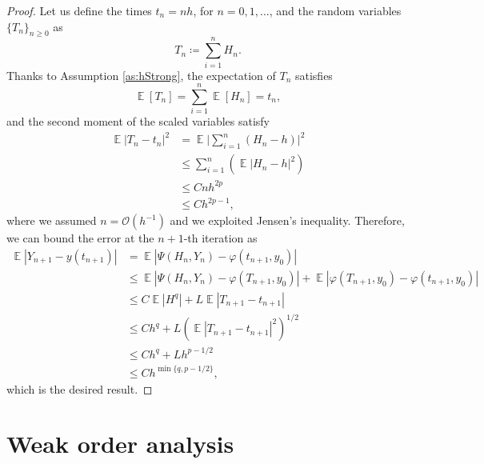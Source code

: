 \documentclass{siamart1116}
\numberwithin{theorem}{section}
\renewcommand{\phi}{\varphi}
\newcommand{\OO}{\mathcal{O}}
\newcommand{\defeq}{\coloneqq}
\newcommand{\E}{\operatorname{\mathbb{E}}}
\begin{document}
\begin{proof} Let us define the times $t_n = nh$, for $n = 0, 1, \ldots$, and the random variables $\{T_n\}_{n\geq 0}$ as
	\begin{equation}
		T_n \defeq \sum_{i=1}^{n} H_n.
	\end{equation}
	Thanks to Assumption \ref{as:hStrong}, the expectation of $T_n$ satisfies
	\begin{equation}
		\E[T_n] = \sum_{i=1}^{n}\E[H_n] = t_n,
	\end{equation} 
	and the second moment of the scaled variables satisfy
	\begin{equation}
	\begin{aligned}
		\E|T_n - t_n|^2 &= \E\Big|\sum_{i=1}^{n}(H_n - h)\Big|^2 \\
		&\leq \sum_{i = 1}^{n}(\E|H_n - h|^2) \\
		&\leq Cnh^{2p} \\
		&\leq Ch^{2p-1}, 
	\end{aligned} 
	\end{equation}
	where we assumed $n = \OO(h^{-1})$ and we exploited Jensen's inequality. Therefore, we can bound the error at the $n+1$-th iteration as
	\begin{equation}
	\begin{aligned}
		\E|Y_{n+1} - y(t_{n+1})| &= \E|\Psi(H_n, Y_n) - \phi(t_{n+1},y_0)|\\
		&\leq \E|\Psi(H_n, Y_n) - \phi(T_{n+1}, y_0)| + \E|\phi(T_{n+1}, y_0) - \phi(t_{n+1},y_0)| \\
		&\leq C\E|H^q|+ L\E|T_{n+1} - t_{n+1}|\\
		&\leq Ch^q + L(\E|T_{n+1} - t_{n+1}|^2)^{1/2}\\
		&\leq Ch^q + Lh^{p - 1/2}\\
		&\leq Ch^{\min\{q, p-1/2\}},
	\end{aligned}
	\end{equation}
	which is the desired result.
\end{proof}

\section{Weak order analysis}
\end{document}
